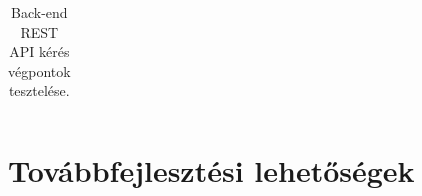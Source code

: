 \begin{table}[H]
\begin{tabular}{ | c | l | c | l | }
	\end{tabular}
	\caption[Szerveroldali végpontok tesztelése]{Back-end REST API kérés végpontok tesztelése.}
	\label{tab:example-4}
\end{table}


\section{Továbbfejlesztési lehetőségek}